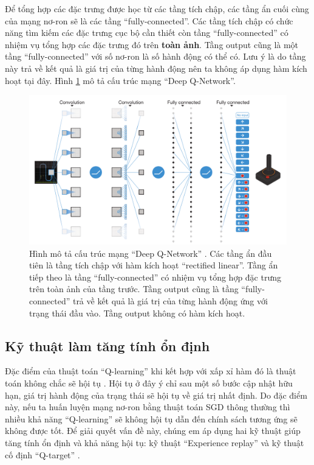 	Để tổng hợp các đặc trưng được học từ các tầng tích chập, các tầng ẩn cuối cùng của mạng nơ-ron sẽ là các tầng ``fully-connected''.
	Các tầng tích chập có chức năng tìm kiếm các đặc trưng cục bộ cần thiết còn tầng ``fully-connected'' có nhiệm vụ tổng hợp các đặc trưng đó trên \textbf{toàn ảnh}.
	Tầng output cũng là một tầng ``fully-connected'' với số nơ-ron là số hành động có thể có.
	Lưu ý là do tầng này trả về kết quả là giá trị của từng hành động nên ta không áp dụng hàm kích hoạt tại đây.
	Hình \ref{fig_dqn_nature} mô tả cấu trúc mạng ``Deep Q-Network''.
	\begin{figure}
		\centering
		\includegraphics[width=\textwidth]{dqn}
		\caption[Cấu trúc mạng ``Deep Q-Network'']{Hình mô tả cấu trúc mạng ``Deep Q-Network'' \cite{mnihdqn2015}.
		Các tầng ẩn đầu tiên là tầng tích chập với hàm kích hoạt ``rectified linear''.
		Tầng ẩn tiếp theo là tầng ``fully-connected'' có nhiệm vụ tổng hợp đặc trưng trên toàn ảnh của tầng trước.
		Tầng output cũng là tầng ``fully-connected'' trả về kết quả là giá trị của từng hành động ứng với trạng thái đầu vào.
		Tầng output không có hàm kích hoạt.}
		\label{fig_dqn_nature}
	\end{figure}

\subsection{Kỹ thuật làm tăng tính ổn định}
	Đặc điểm của thuật toán ``Q-learning'' khi kết hợp với xấp xỉ hàm đó là thuật toán không chắc sẽ hội tụ \cite{sutton1998introduction}.
	Hội tụ ở đây ý chỉ sau một số bước cập nhật hữu hạn, giá trị hành động của trạng thái sẽ hội tụ về giá trị nhất định.
	Do đặc điểm này, nếu ta huấn luyện mạng nơ-ron bằng thuật toán SGD thông thường thì nhiều khả năng ``Q-learning'' sẽ không hội tụ dẫn đến chính sách tương ứng sẽ không được tốt.
	Để giải quyết vấn đề này, chúng em áp dụng hai kỹ thuật giúp tăng tính ổn định và khả năng hội tụ: kỹ thuật ``Experience replay'' \cite{lin1993reinforcement} và kỹ thuật cố định ``Q-target'' \cite{mnih2013playing}.
	
